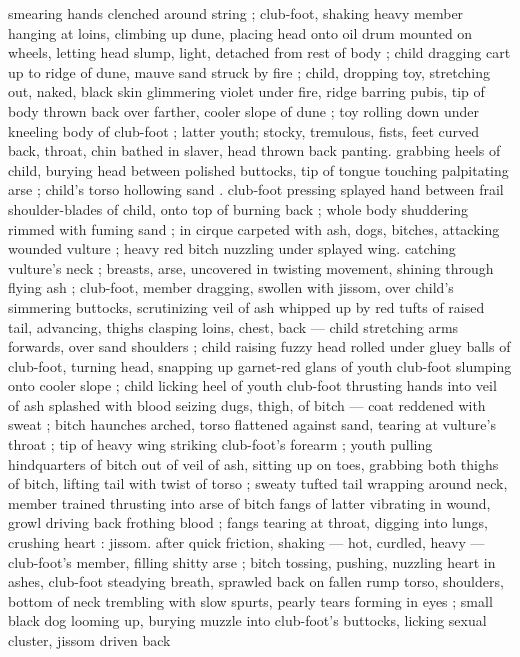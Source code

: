 smearing hands clenched around string ; club-foot, shaking heavy 
member hanging at loins, climbing up dune, placing head onto oil 
drum mounted on wheels, letting head slump, light, detached from 
rest of body ; child dragging cart up to ridge of dune, mauve sand 
struck by fire ; child, dropping toy, stretching out, naked, black skin 
glimmering violet under fire, ridge barring pubis, tip of body thrown 
back over farther, cooler slope of dune ; toy rolling down under 
kneeling body of club-foot ; latter youth; stocky, tremulous, fists, feet 
curved back, throat, chin bathed in slaver, head thrown back panting. 
grabbing heels of child, burying head between polished buttocks, tip 
of tongue touching palpitating arse ; child's torso hollowing sand . 
club-foot pressing splayed hand between frail shoulder-blades of 
child, onto top of burning back ; whole body shuddering rimmed with 
fuming sand ; in cirque carpeted with ash, dogs, bitches, attacking 
wounded vulture ; heavy red bitch nuzzling under splayed wing. 
catching vulture's neck ; breasts, arse, uncovered in twisting 
movement, shining through flying ash ; club-foot, member dragging,
swollen with jissom, over child's simmering buttocks, scrutinizing veil 
of ash whipped up by red tufts of raised tail, advancing, thighs 
clasping loins, chest, back --- child stretching arms forwards, over 
sand {\dashcom} shoulders ; child raising fuzzy head rolled under gluey balls 
of club-foot, turning head, snapping up garnet-red glans of youth 
club-foot slumping onto cooler slope ; child licking heel of youth 
club-foot thrusting hands into veil of ash splashed with blood 
seizing dugs, thigh, of bitch --- coat reddened with sweat ; bitch 
haunches arched, torso flattened against sand, tearing at vulture's 
throat ; tip of heavy wing striking club-foot's forearm ; youth pulling 
hindquarters of bitch out of veil of ash, sitting up on toes, grabbing 
both thighs of bitch, lifting tail with twist of torso ; sweaty tufted tail 
wrapping around neck, member trained thrusting into arse of bitch 
fangs of latter vibrating in wound, growl driving back frothing blood 
; fangs tearing at throat, digging into lungs, crushing heart : jissom. 
after quick friction, shaking --- hot, curdled, heavy --- club-foot's 
member, filling shitty arse ; bitch tossing, pushing, nuzzling heart in 
ashes, club-foot steadying breath, sprawled back on fallen rump 
torso, shoulders, bottom of neck trembling with slow spurts, pearly 
tears forming in eyes ; small black dog looming up, burying muzzle 
into club-foot's buttocks, licking sexual cluster, jissom driven back 
